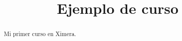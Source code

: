 \documentclass{xourse}
\title{Ejemplo de curso}
\begin{document}
  
\begin{abstract} %
Mi primer curso en Ximera.  
\end{abstract}  
\maketitle  
 
 
\end{document}
